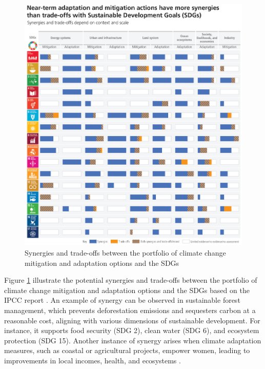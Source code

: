 \begin{figure}[p]
    \centering
    \includegraphics[width=\textwidth]{figs/chap2/IPCC_AR6_SYR_Figure_4_5.png}
    \caption[Synergies and trade-offs of climate action to other SDGs]{Synergies and trade-offs between the portfolio of climate change mitigation and adaptation options and the SDGs \citep{lee2023climate}}
    \label{fig:chap2_fig6}
\end{figure}
Figure \ref{fig:chap2_fig6} illustrate the potential synergies and trade-offs between the portfolio of climate change mitigation and adaptation options and the SDGs based on the IPCC report \citep{lee2023climate}. An example of synergy can be observed in sustainable forest management, which prevents deforestation emissions and sequesters carbon at a reasonable cost, aligning with various dimensions of sustainable development. For instance, it supports food security (SDG 2), clean water (SDG 6), and ecosystem protection (SDG 15). Another instance of synergy arises when climate adaptation measures, such as coastal or agricultural projects, empower women, leading to improvements in local incomes, health, and ecosystems \citep{ipcccfaq}. \par
